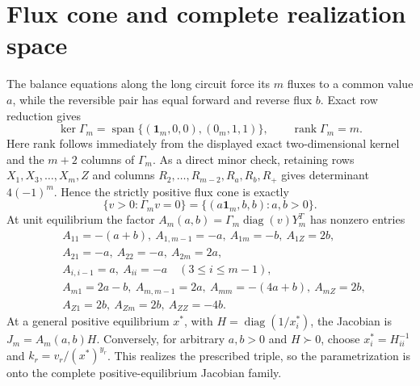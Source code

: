 \section*{Flux cone and complete realization space}
The balance equations along the long circuit force its $m$ fluxes to a common value $a$, while the reversible pair has equal forward and reverse flux $b$.  Exact row reduction gives
\[
\ker\Gamma_m=\operatorname{span}\{(\mathbf1_m,0,0),(0_m,1,1)\},
\qquad \operatorname{rank}\Gamma_m=m.
\]
Here rank follows immediately from the displayed exact two-dimensional kernel
and the $m+2$ columns of $\Gamma_m$.  As a direct minor check, retaining rows
$X_1,X_3,\ldots,X_m,Z$ and columns
$R_2,\ldots,R_{m-2},R_a,R_b,R_+$ gives determinant $4(-1)^m$.
Hence the strictly positive flux cone is exactly
\[
\{v>0:\Gamma_mv=0\}=\{(a\mathbf1_m,b,b):a,b>0\}.
\]
At unit equilibrium the factor $A_m(a,b)=\Gamma_m\operatorname{diag}(v)Y_m^T$ has nonzero entries
\begin{align*}
&A_{11}=-(a+b),\ A_{1,m-1}=-a,\ A_{1m}=-b,\ A_{1Z}=2b,\\
&A_{21}=-a,\ A_{22}=-a,\ A_{2m}=2a,\\
&A_{i,i-1}=a,\ A_{ii}=-a\quad(3\le i\le m-1),\\
&A_{m1}=2a-b,\ A_{m,m-1}=2a,\ A_{mm}=-(4a+b),\ A_{mZ}=2b,\\
&A_{Z1}=2b,\ A_{Zm}=2b,\ A_{ZZ}=-4b.
\end{align*}
At a general positive equilibrium $x^*$, with $H=\operatorname{diag}(1/x_i^*)$, the Jacobian is $J_m=A_m(a,b)H$.  Conversely, for arbitrary $a,b>0$ and $H\succ0$, choose $x_i^*=H_{ii}^{-1}$ and $k_r=v_r/(x^*)^{y_r}$.  This realizes the prescribed triple, so the parametrization is onto the complete positive-equilibrium Jacobian family.
